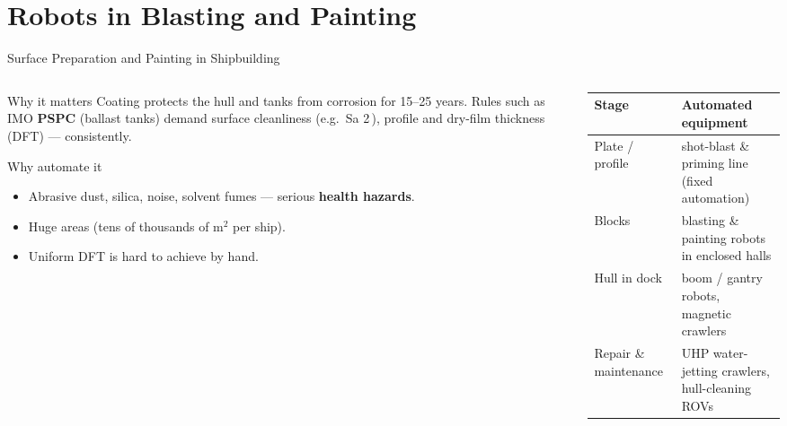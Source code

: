 \documentclass[aspectratio=169]{beamer}
\begin{document}
	\section{Robots in Blasting and Painting}
	\begin{frame}{Surface Preparation and Painting in Shipbuilding}
		\begin{columns}[T]
			\begin{column}{0.5\textwidth}
				\begin{block}{Why it matters}
					\small Coating protects the hull and tanks from corrosion for 15--25 years. Rules such as IMO \textbf{PSPC} (ballast tanks) demand surface cleanliness (e.g.\ Sa 2\,\textonehalf), profile and dry-film thickness (DFT) --- consistently.
				\end{block}
				\begin{block}{Why automate it}
					\begin{itemize}\small
						\item Abrasive dust, silica, noise, solvent fumes --- serious \textbf{health hazards}.
						\item Huge areas (tens of thousands of m$^2$ per ship).
						\item Uniform DFT is hard to achieve by hand.
					\end{itemize}
				\end{block}
			\end{column}
			\begin{column}{0.5\textwidth}
				\renewcommand{\arraystretch}{1.25}
				\centering
				\small
				\begin{tabular}{@{}>{\raggedright}p{2.4cm}>{\raggedright\arraybackslash}p{3.4cm}@{}}
					\toprule
					\textbf{Stage} & \textbf{Automated equipment} \\
					\midrule
					Plate / profile & shot-blast \& priming line (fixed automation) \\
					Blocks          & blasting \& painting robots in enclosed halls \\
					Hull in dock    & boom / gantry robots, magnetic crawlers \\
					Repair \& maintenance & UHP water-jetting crawlers, hull-cleaning ROVs \\
					\bottomrule
				\end{tabular}
			\end{column}
		\end{columns}
	\end{frame}
\end{document}
